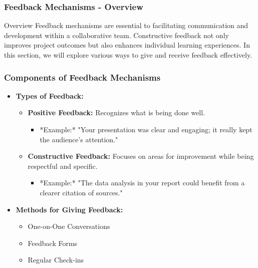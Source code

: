 \documentclass[aspectratio=169]{beamer}
\begin{document}
\begin{frame}[fragile]
    \frametitle{Feedback Mechanisms - Overview}
    \begin{block}{Overview}
        Feedback mechanisms are essential to facilitating communication and development within a collaborative team. 
        Constructive feedback not only improves project outcomes but also enhances individual learning experiences. 
        In this section, we will explore various ways to give and receive feedback effectively.
    \end{block}
\end{frame}

\begin{frame}[fragile]
    \frametitle{Components of Feedback Mechanisms}
    \begin{itemize}
        \item \textbf{Types of Feedback:}
        \begin{itemize}
            \item \textbf{Positive Feedback:} Recognizes what is being done well. 
            \begin{itemize}
                \item *Example:* "Your presentation was clear and engaging; it really kept the audience's attention."
            \end{itemize}
            \item \textbf{Constructive Feedback:} Focuses on areas for improvement while being respectful and specific.
            \begin{itemize}
                \item *Example:* "The data analysis in your report could benefit from a clearer citation of sources."
            \end{itemize}
        \end{itemize}
        
        \item \textbf{Methods for Giving Feedback:}
        \begin{itemize}
            \item One-on-One Conversations
            \item Feedback Forms
            \item Regular Check-ins
        \end{itemize}
    \end{itemize}
\end{frame}
\end{document}
